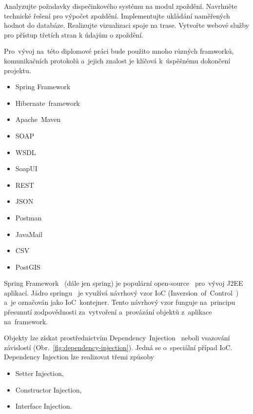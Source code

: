 
Analyzujte požadavky dispečinkového systému na modul zpoždění.
Navrhněte technické řešení pro výpočet zpoždění.
Implementujte ukládání naměřených hodnot do databáze.
Realizujte vizualizaci spoje na trase.
Vytvořte webové služby pro přístup třetích stran k údajům o zpoždění.



Pro~vývoj na~této diplomové práci bude použito mnoho různých framworků, komunikačních protokolů a~jejich znalost je klíčová k~úspěšnému dokončení projektu.  
\begin{itemize}
	\setlength{\parskip}{0pt}
	\setlength{\itemsep}{0pt}
	\item {Spring Framework}
	\item {Hibernate~framework}
	\item {Apache~Maven}
	\item {SOAP}
	\item {WSDL}
	\item {SoapUI}
	\item {REST}
	\item {JSON}
	\item {Postman}
	\item {JavaMail}
	\item {CSV}
	\item {PostGIS}
\end{itemize}
Spring Framework~\cite{spring-framework} (dále jen spring) je populární open-source~\cite{open-source} pro~vývoj J2EE~\cite{j2ee} aplikací. Jádro springu~\cite{spring-in-action} je využívá návrhový vzor IoC (Inversion~of~Control~\cite{ioc}) a~je označován jako IoC~kontejner. Tento návrhový vzor funguje na~principu přesunutí zodpovědnosti za~vytvoření a~provázání objektů z~aplikace na~framework.

Objekty lze získat prostřednictvím Dependency~Injection~\cite{dependency-injection} neboli vsazování závislostí (Obr.~\ref{fig:dependency-injection}). Jedná se o~speciální případ IoC. Dependency Injection lze realizovat třemi způsoby
\begin{itemize}
	\setlength{\parskip}{0pt}
	\setlength{\itemsep}{0pt}
	\item {Setter Injection,}
	\item {Constructor Injection,}
	\item {Interface Injection.}
\end{itemize}


